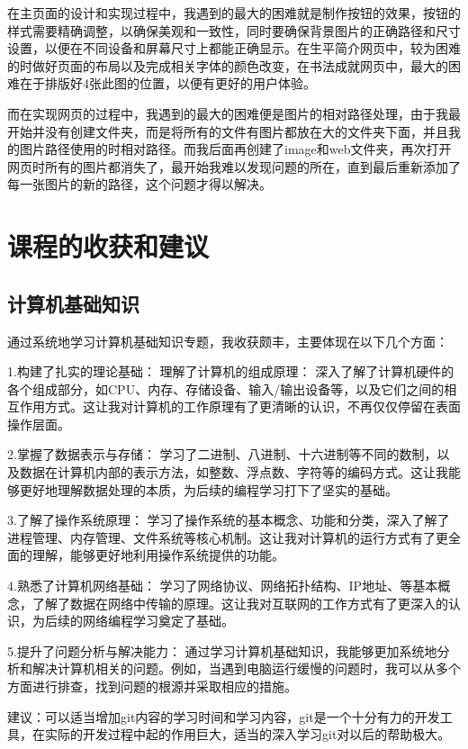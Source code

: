 \documentclass[supercite]{Experimental_Report}
\theoremstyle{definition}
\begin{document}
在主页面的设计和实现过程中，我遇到的最大的困难就是制作按钮的效果，按钮的样式需要精确调整，以确保美观和一致性，同时要确保背景图片的正确路径和尺寸设置，以便在不同设备和屏幕尺寸上都能正确显示。在生平简介网页中，较为困难的时做好页面的布局以及完成相关字体的颜色改变，在书法成就网页中，最大的困难在于排版好4张此图的位置，以便有更好的用户体验。
\par 而在实现网页的过程中，我遇到的最大的困难便是图片的相对路径处理，由于我最开始并没有创建文件夹，而是将所有的文件有图片都放在大的文件夹下面，并且我的图片路径使用的时相对路径。而我后面再创建了image和web文件夹，再次打开网页时所有的图片都消失了，最开始我难以发现问题的所在，直到最后重新添加了每一张图片的新的路径，这个问题才得以解决。

\newpage

\section{课程的收获和建议}


\subsection{计算机基础知识}
通过系统地学习计算机基础知识专题，我收获颇丰，主要体现在以下几个方面：

\par 1.构建了扎实的理论基础：
理解了计算机的组成原理： 深入了解了计算机硬件的各个组成部分，如CPU、内存、存储设备、输入/输出设备等，以及它们之间的相互作用方式。这让我对计算机的工作原理有了更清晰的认识，不再仅仅停留在表面操作层面。
\par 2.掌握了数据表示与存储： 学习了二进制、八进制、十六进制等不同的数制，以及数据在计算机内部的表示方法，如整数、浮点数、字符等的编码方式。这让我能够更好地理解数据处理的本质，为后续的编程学习打下了坚实的基础。
\par 3.了解了操作系统原理： 学习了操作系统的基本概念、功能和分类，深入了解了进程管理、内存管理、文件系统等核心机制。这让我对计算机的运行方式有了更全面的理解，能够更好地利用操作系统提供的功能。
\par 4.熟悉了计算机网络基础： 学习了网络协议、网络拓扑结构、IP地址、等基本概念，了解了数据在网络中传输的原理。这让我对互联网的工作方式有了更深入的认识，为后续的网络编程学习奠定了基础。
\par 5.提升了问题分析与解决能力： 通过学习计算机基础知识，我能够更加系统地分析和解决计算机相关的问题。例如，当遇到电脑运行缓慢的问题时，我可以从多个方面进行排查，找到问题的根源并采取相应的措施。
\par 建议：可以适当增加git内容的学习时间和学习内容，git是一个十分有力的开发工具，在实际的开发过程中起的作用巨大，适当的深入学习git对以后的帮助极大。
\end{document}

